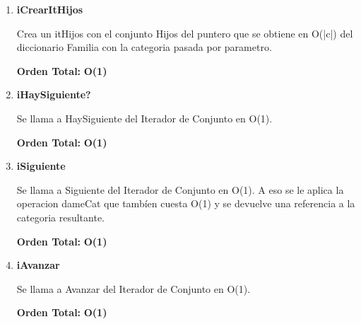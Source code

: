 \vspace*{1em}
\begin{enumerate}

\item\textbf{iCrearItHijos}
\par Crea un itHijos con el conjunto Hijos del puntero que se obtiene en O(|c|) del diccionario Familia con la categoria pasada por parametro.
\par \textbf{Orden Total:} \textbf{O(1)}

\item\textbf{iHaySiguiente?}
\par Se llama a HaySiguiente del Iterador de Conjunto en O(1).
\par \textbf{Orden Total:} \textbf{O(1)}

\item\textbf{iSiguiente}
\par Se llama a Siguiente del Iterador de Conjunto en O(1). A eso se le aplica la operacion dameCat que tambíen cuesta O(1) y se devuelve una referencia a la categoria resultante.
\par \textbf{Orden Total:} \textbf{O(1)}

\item\textbf{iAvanzar}
\par Se llama a Avanzar del Iterador de Conjunto en O(1).
\par \textbf{Orden Total:} \textbf{O(1)}

\end{enumerate}



